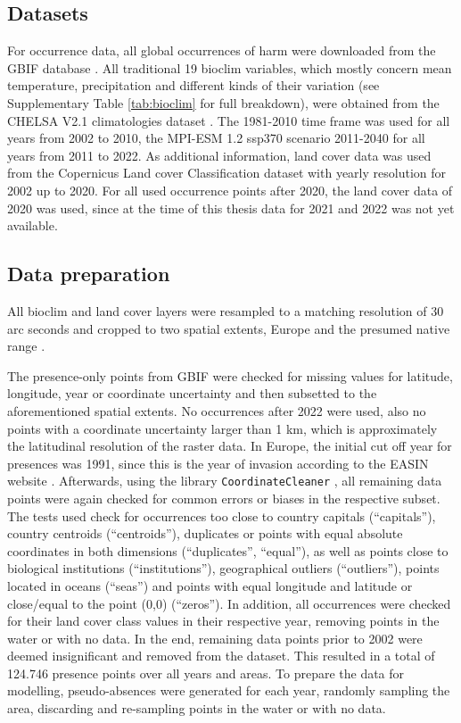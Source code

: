 \documentclass[12pt,a4paper]{article}
\begin{document}
\subsection{Datasets} \label{ssec:datasets}
For occurrence data, all global occurrences of \gls{harm} were downloaded from the GBIF database \autocite{GBIFaxyridisdataset}.
All traditional 19 bioclim variables, which mostly concern mean temperature, precipitation and different kinds of their variation (see Supplementary Table \ref{tab:bioclim} for full breakdown), were obtained from the CHELSA V2.1 climatologies dataset \autocite{karger2017CHELSApaper, CHELSAbioclimdataset}.
The 1981-2010 time frame was used for all years from 2002 to 2010, the MPI-ESM 1.2 ssp370 scenario 2011-2040 for all years from 2011 to 2022.
As additional information, land cover data was used from the Copernicus Land cover Classification dataset \autocite{COPlandcoverdataset}  with yearly resolution for 2002 up to 2020.
For all used occurrence points after 2020, the land cover data of 2020 was used, since at the time of this thesis data for 2021 and 2022 was not yet available.

\subsection{Data preparation} \label{ssec:datapreparation}
All bioclim and land cover layers were resampled to a matching resolution of 30 arc seconds and cropped to two spatial extents, Europe and the presumed native range \autocite{orlova2015harmonia}.

The presence-only points from GBIF were checked for missing values for latitude, longitude, year or coordinate uncertainty and then subsetted to the aforementioned spatial extents.
No occurrences after 2022 were used, also no points with a coordinate uncertainty larger than 1 km, which is approximately the latitudinal resolution of the raster data.
In Europe, the initial cut off year for presences was 1991, since this is the year of invasion according to the EASIN website \autocite{EASINintroharm}.
Afterwards, using the library \texttt{CoordinateCleaner} \autocite{zizka2019coordinatecleaner}, all remaining data points were again checked for common errors or biases in the respective subset.
The tests used check for occurrences too close to country capitals (``capitals''), country centroids (``centroids''), duplicates or points with equal absolute coordinates in both dimensions (``duplicates'', ``equal''), as well as points close to biological institutions (``institutions''), geographical outliers (``outliers''), points located in oceans (``seas'') and points with equal longitude and latitude or close/equal to the point (0,0) (``zeros'').
In addition, all occurrences were checked for their land cover class values in their respective year, removing points in the water or with no data.
In the end, remaining data points prior to 2002 were deemed insignificant and removed from the dataset.
This resulted in a total of 124.746 presence points over all years and areas.
To prepare the data for modelling, pseudo-absences were generated for each year, randomly sampling the area, discarding and re-sampling points in the water or with no data.
\end{document}
